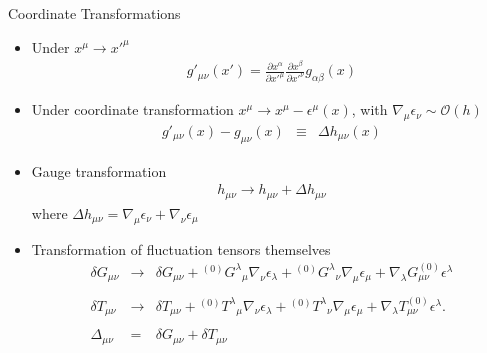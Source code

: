 \documentclass[8pt,aspectratio=1610]{beamer}
\begin{document}
\begin{frame}{Coordinate Transformations}
	\begin{itemize}
		\item Under $x^\mu \to x'^\mu$
		\begin{eqnarray}
			g'_{\mu\nu}(x') = \frac{\partial x^\alpha}{\partial x'^\mu}\frac{\partial x^\beta}{\partial x'^\nu}g_{\alpha\beta}(x)
		\end{eqnarray}
		\item 	Under coordinate transformation $x^\mu \to x^\mu - \epsilon^\mu(x)$, with $\nabla_\mu \epsilon_\nu \sim \mathcal O(h)$
			\begin{eqnarray}
				g'_{\mu\nu}(x) - g_{\mu\nu}(x) &\equiv& \Delta h_{\mu\nu}(x)
			\end{eqnarray}
		\item Gauge transformation 
				\begin{eqnarray}
				h_{\mu\nu} \to h_{\mu\nu} + \Delta h_{\mu\nu} 
				\end{eqnarray}
				where $\Delta h_{\mu\nu} = \nabla_\mu \epsilon_\nu + \nabla_\nu \epsilon_\mu$
		\item Transformation of fluctuation tensors themselves
				\begin{eqnarray}
				\delta G_{\mu\nu} &\to& \delta G_{\mu\nu} + {}^{(0)}G^\lambda{}_\mu \nabla_\nu \epsilon_\lambda +  {}^{(0)}G^{\lambda}{}_{\nu}\nabla_\mu \epsilon_\mu + \nabla_\lambda  G^{(0)}_{\mu\nu} \epsilon^\lambda
				\\ \nonumber\\
				\delta T_{\mu\nu} &\to& \delta T_{\mu\nu} + {}^{(0)}T^\lambda{}_\mu \nabla_\nu \epsilon_\lambda +  {}^{(0)}T^{\lambda}{}_{\nu}\nabla_\mu \epsilon_\mu + \nabla_\lambda  T^{(0)}_{\mu\nu} \epsilon^\lambda.
				\\ \nonumber\\
				\Delta_{\mu\nu} &=& \delta G_{\mu\nu} + \delta T_{\mu\nu}
			\end{eqnarray}
	\end{itemize}


\end{frame}
\end{document}
